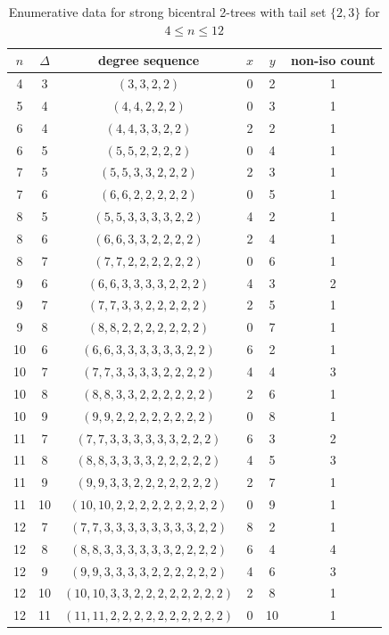 \documentclass[12pt]{article}
\numberwithin{equation}{section}
\begin{document}
\begin{table}[h]
\caption{Enumerative data for strong bicentral 2-trees with tail set $\{2,3\}$ for $4 \leq n \leq 12$}
\label{Tab1}
\centering
\small
\begin{tabular}{cccccc}
\toprule
$n$ & $\Delta$ & degree sequence & $x$ & $y$ & non-iso count \\
\midrule
4 & 3 & $(3,3,2,2)$ & 0 & 2 & 1 \\
\midrule
5 & 4 & $(4,4,2,2,2)$ & 0 & 3 & 1 \\
\midrule
6 & 4 & $(4,4,3,3,2,2)$ & 2 & 2 & 1 \\
6 & 5 & $(5,5,2,2,2,2)$ & 0 & 4 & 1 \\
\midrule
7 & 5 & $(5,5,3,3,2,2,2)$ & 2 & 3 & 1 \\
7 & 6 & $(6,6,2,2,2,2,2)$ & 0 & 5 & 1 \\
\midrule
8 & 5 & $(5,5,3,3,3,3,2,2)$ & 4 & 2 & 1 \\
8 & 6 & $(6,6,3,3,2,2,2,2)$ & 2 & 4 & 1 \\
8 & 7 & $(7,7,2,2,2,2,2,2)$ & 0 & 6 & 1 \\
\midrule
9 & 6 & $(6,6,3,3,3,3,2,2,2)$ & 4 & 3 & 2 \\
9 & 7 & $(7,7,3,3,2,2,2,2,2)$ & 2 & 5 & 1 \\
9 & 8 & $(8,8,2,2,2,2,2,2,2)$ & 0 & 7 & 1 \\
\midrule
10 & 6 & $(6,6,3,3,3,3,3,3,2,2)$ & 6 & 2 & 1 \\
10 & 7 & $(7,7,3,3,3,3,2,2,2,2)$ & 4 & 4 & 3 \\
10 & 8 & $(8,8,3,3,2,2,2,2,2,2)$ & 2 & 6 & 1 \\
10 & 9 & $(9,9,2,2,2,2,2,2,2,2)$ & 0 & 8 & 1 \\
\midrule
11 & 7 & $(7,7,3,3,3,3,3,3,2,2,2)$ & 6 & 3 & 2 \\
11 & 8 & $(8,8,3,3,3,3,2,2,2,2,2)$ & 4 & 5 & 3 \\
11 & 9 & $(9,9,3,3,2,2,2,2,2,2,2)$ & 2 & 7 & 1 \\
11 & 10 & $(10,10,2,2,2,2,2,2,2,2,2)$ & 0 & 9 & 1 \\
\midrule
12 & 7 & $(7,7,3,3,3,3,3,3,3,3,2,2)$ & 8 & 2 & 1 \\
12 & 8 & $(8,8,3,3,3,3,3,3,2,2,2,2)$ & 6 & 4 & 4 \\
12 & 9 & $(9,9,3,3,3,3,2,2,2,2,2,2)$ & 4 & 6 & 3 \\
12 & 10 & $(10,10,3,3,2,2,2,2,2,2,2,2)$ & 2 & 8 & 1 \\
12 & 11 & $(11,11,2,2,2,2,2,2,2,2,2,2)$ & 0 & 10 & 1 \\
\bottomrule
\end{tabular}
\end{table}
\end{document}
